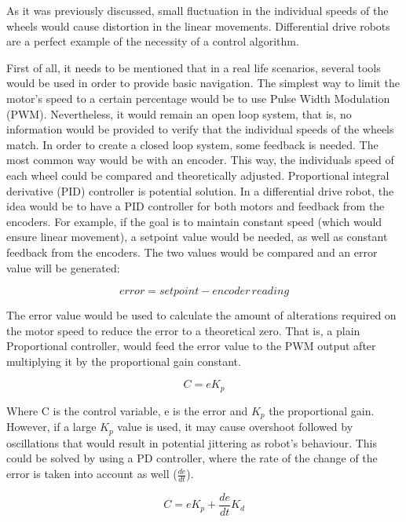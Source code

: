 {As it was previously discussed, small fluctuation in the individual speeds of the wheels would cause distortion in the linear movements. Differential drive robots are a perfect example of the necessity of a control algorithm.

First of all, it needs to be mentioned that in a real life scenarios, several tools would be used in order to provide basic navigation. The simplest way to limit the motor's speed to a certain percentage would be to use Pulse Width Modulation (PWM). Nevertheless, it would remain an open loop system, that is, no information would be provided to verify that the individual speeds of  the wheels match. In order to create a closed loop system, some feedback is needed. The most common way would be with an encoder. This way, the individuals speed of each wheel could be compared and theoretically adjusted. 
Proportional integral derivative (PID) controller is potential solution. In a differential drive robot, the idea would be to have a PID controller for both motors and feedback from the encoders. For example, if the goal is to maintain constant speed (which would ensure linear movement), a setpoint value would be needed, as well as constant feedback from the encoders. The two values would be compared and an error value will be generated:\cite{PID}

\begin{equation}
error = setpoint - encoder\,reading
\end{equation}

The error value would be used to calculate the amount of alterations required on the motor speed to reduce the error to a theoretical zero. That is, a plain Proportional controller, would feed the error value to the PWM output after multiplying it by the proportional gain constant. 

\begin{equation}
C = eK_p 
\end{equation}

Where C is the control variable, e is the error and $K_p$ the proportional gain. 
However, if a large $K_p$ value is used, it may cause overshoot followed by oscillations that would result in potential jittering as robot's behaviour. This could be solved by using a PD controller, where the rate of the change of the error is taken into account as well ($\frac{de}{dt}$). 

\begin{equation}
C = eK_p + \frac{de}{dt}K_d
\end{equation}

}
